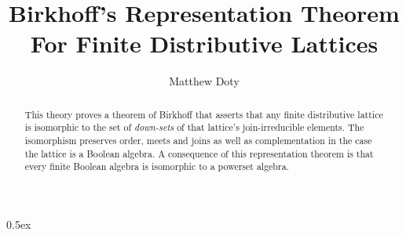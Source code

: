 \documentclass[11pt,a4paper]{article}
\begin{document}
\title{Birkhoff's Representation Theorem For Finite Distributive
  Lattices}

\author{Matthew Doty}

\maketitle

\begin{abstract}
  This theory proves a theorem of Birkhoff that asserts that any
  finite distributive lattice is isomorphic to the set of
  \emph{down-sets} of that lattice's join-irreducible elements. The
  isomorphism preserves order, meets and joins as well as
  complementation in the case the lattice is a Boolean algebra. A
  consequence of this representation theorem is that every finite
  Boolean algebra is isomorphic to a powerset algebra.
\end{abstract}

\tableofcontents

\newpage

\parindent 0pt\parskip 0.5ex





\end{document}
